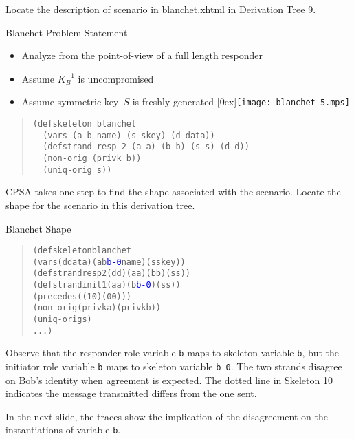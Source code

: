 \documentclass[landscape]{slides}
\newcommand{\cpsa}{CPSA}
\newcommand{\privk}[1]{K^{-1}_{#1}}
\begin{document}
\begin{note}
  Locate the description of scenario in \url{blanchet.xhtml} in
  Derivation Tree 9.
\end{note}

\begin{mitreslide}{Blanchet Problem Statement}
\begin{itemize}
\item Analyze from the point-of-view of a full length responder
\item Assume $\privk{B}$ is uncompromised
\item Assume symmetric key~$S$ is freshly generated
\hfill\raisebox{0ex}[0ex]{\texttt{[image: blanchet-5.mps]}}
\end{itemize}
\begin{quote}
\begin{verbatim}
(defskeleton blanchet
  (vars (a b name) (s skey) (d data))
  (defstrand resp 2 (a a) (b b) (s s) (d d))
  (non-orig (privk b))
  (uniq-orig s))
\end{verbatim}
\end{quote}
\end{mitreslide}

\begin{note}
  {\cpsa} takes one step to find the shape associated with the scenario.
  Locate the shape for the scenario in this derivation tree.
\end{note}

\begin{mitreslide}{Blanchet Shape}
\begin{quote}
\begin{alltt}
(defskeleton blanchet
  (vars (d data) (a b \textcolor{blue}{b-0} name) (s skey))
  (defstrand resp 2 (d d) (a a) (b b) (s s))
  (defstrand init 1 (a a) (b \textcolor{blue}{b-0}) (s s))
  (precedes ((1 0) (0 0)))
  (non-orig (privk a) (privk b))
  (uniq-orig s)
  ...)
\end{alltt}
\end{quote}
\end{mitreslide}

\begin{note}
  Observe that the responder role variable \texttt{b} maps to skeleton
  variable \texttt{b}, but the initiator role variable \texttt{b} maps
  to skeleton variable \texttt{b\_0}.  The two strands disagree on
  Bob's identity when agreement is expected.  The dotted line in
  Skeleton 10 indicates the message transmitted differs from the one sent.

  In the next slide, the traces show the implication of the
  disagreement on the instantiations of variable \texttt{b}.
\end{note}
\end{document}
